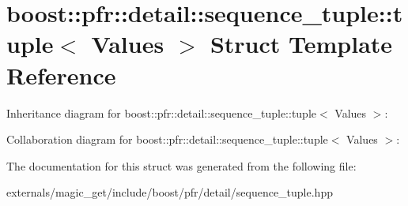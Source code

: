 \hypertarget{structboost_1_1pfr_1_1detail_1_1sequence__tuple_1_1tuple}{}\section{boost\+:\+:pfr\+:\+:detail\+:\+:sequence\+\_\+tuple\+:\+:tuple$<$ Values $>$ Struct Template Reference}
\label{structboost_1_1pfr_1_1detail_1_1sequence__tuple_1_1tuple}


Inheritance diagram for boost\+:\+:pfr\+:\+:detail\+:\+:sequence\+\_\+tuple\+:\+:tuple$<$ Values $>$\+:


Collaboration diagram for boost\+:\+:pfr\+:\+:detail\+:\+:sequence\+\_\+tuple\+:\+:tuple$<$ Values $>$\+:


The documentation for this struct was generated from the following file\+:\begin{DoxyCompactItemize}
\item 
externals/magic\+\_\+get/include/boost/pfr/detail/sequence\+\_\+tuple.\+hpp\end{DoxyCompactItemize}
